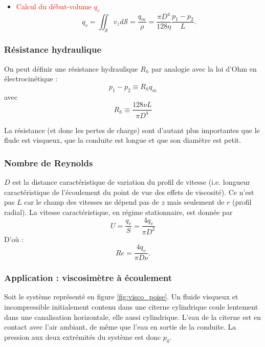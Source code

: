 \documentclass[11pt,a4paper]{report}
\begin{document}
\begin{itemize}
	\item \textcolor{red}{Calcul du début-volume $q_v$}
	\begin{equation}
		q_v = \iint_\mathcal{S} v_z d\mathcal{S} = \frac{q_m}{\rho} = \frac{\pi D^4}{128\eta}\frac{p_1-p_2}{L}.
	\end{equation}	
\end{itemize}

\subsubsection{Résistance hydraulique}

On peut définir une résistance hydraulique $R_h$ par analogie avec la loi d'Ohm en électrocinétique :
\begin{equation}
	p_1 - p_2 \equiv R_h q_m
\end{equation}
avec
\begin{equation}
	R_h \equiv \frac{128 \nu L}{\pi D^4}	
\end{equation}

La résistance (et donc les pertes de charge) sont d'autant plus importantes que le flude est visqueux, que la conduite est longue et que son diamètre est petit.

\subsubsection{Nombre de Reynolds}

$D$ est la distance caractéristique de variation du profil de vitesse (i.e. longueur caractéristique de l'écoulement du point de vue des effets de viscosité). Ce n'est pas $L$ car le champ des vitesses ne dépend pas de $z$ mais seulement de $r$ (profil radial). La vitesse caractéristique, en régime stationnaire, est donnée par
\begin{equation}
	U = \frac{q_v}{S} = \frac{4 q_v}{\pi D^2}
\end{equation}
D'où :
\begin{equation}
	Re = \frac{4 q_v}{\pi D \nu}.
\end{equation}

\subsubsection{Application : viscosimètre à écoulement}

Soit le système représenté en figure \ref{fig:visco_poise}. Un fluide visqueux et incompressible initialement contenu dans une citerne cylindrique coule lentement dans une canalisation horizontale, elle aussi cylindrique. L'eau de la citerne est en contact avec l'air ambiant, de même que l'eau en sortie de la conduite. La pression aux deux extrémités du système est donc $p_0$.
\end{document}
